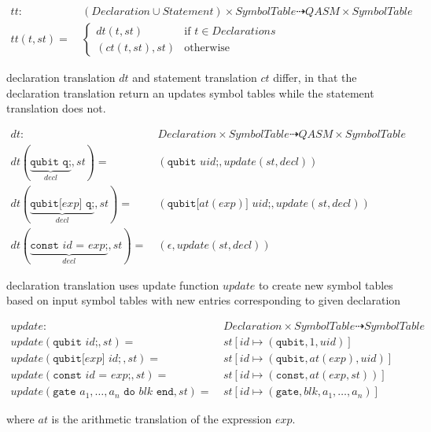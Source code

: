 \begin{align*}
    tt : \ & (Declaration \cup Statement) \times SymbolTable \dashrightarrow QASM \times SymbolTable\\
    tt(t, st) = \ & \begin{cases}
        dt(t, st)  \quad &\text{if } t \in Declarations\\
        (ct(t, st), st) &\text{otherwise }
    \end{cases}  
\end{align*}

declaration translation $dt$ and statement translation $ct$ differ, in that the declaration translation return an updates symbol tables while the statement translation does not. 

\begin{align*}
    dt : \ & Declaration \times SymbolTable \dashrightarrow QASM \times SymbolTable\\
    dt(\underbrace{\texttt{qubit q;}}_{decl}, st) = \ & (\texttt{qubit } uid\texttt{;}, update(st, decl))\\
    dt(\underbrace{\texttt{qubit[} exp \texttt{] q;}}_{decl}, st) = \ & (\texttt{qubit[} at(exp) \texttt{] } uid\texttt{;}, update(st, decl))\\
    dt(\underbrace{\texttt{const } id \texttt{ = } exp \texttt{;}}_{decl}, st) = \ & (\epsilon, update(st, decl))
\end{align*}

declaration translation uses update function $update$ to create new symbol tables based on input symbol tables with new entries corresponding to given declaration

\begin{align*}
    update : \ & Declaration \times SymbolTable \dashrightarrow SymbolTable\\
    update(\texttt{qubit } id\texttt{;}, st) = \ & st[id \mapsto (\texttt{qubit}, 1, uid)]\\
    update(\texttt{qubit[} exp \texttt{] } id{;}, st) = \ & st[id \mapsto (\texttt{qubit}, at(exp), uid)]\\
    update(\texttt{const } id \texttt{ = } exp \texttt{;}, st) = \ & st[id \mapsto (\texttt{const}, at(exp, st))]\\
    update(\texttt{gate } a_1, \dots, a_n \texttt{ do } blk \texttt{ end}, st) = \ & st[id \mapsto (\texttt{gate}, blk, a_1, \dots, a_n)]
\end{align*}

where $at$ is the arithmetic translation of the expression $exp$.


